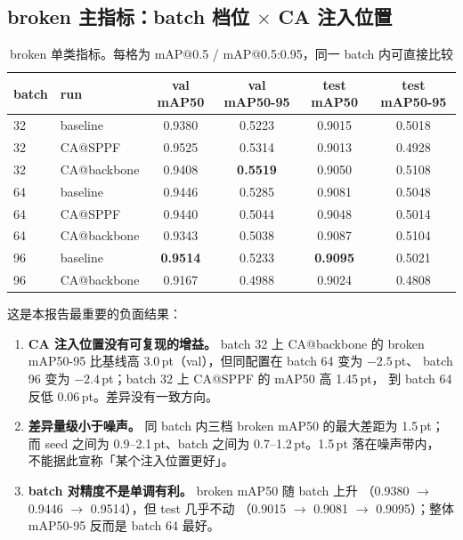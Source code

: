 \documentclass[UTF8,a4paper,11pt]{ctexart}
\begin{document}
\subsection{broken 主指标：batch 档位 $\times$ CA 注入位置}

\begin{table}[htbp]
\centering
\caption{broken 单类指标。每格为 mAP@0.5 / mAP@0.5:0.95，同一 batch 内可直接比较}
\label{tab:broken}
\begin{tabular}{llcccc}
\toprule
batch & run & val mAP50 & val mAP50-95 & test mAP50 & test mAP50-95 \\
\midrule
32 & baseline      & 0.9380 & 0.5223 & 0.9015 & 0.5018 \\
32 & CA@SPPF       & 0.9525 & 0.5314 & 0.9013 & 0.4928 \\
32 & CA@backbone   & 0.9408 & \textbf{0.5519} & 0.9050 & 0.5108 \\
\midrule
64 & baseline      & 0.9446 & 0.5285 & 0.9081 & 0.5048 \\
64 & CA@SPPF       & 0.9440 & 0.5044 & 0.9048 & 0.5014 \\
64 & CA@backbone   & 0.9343 & 0.5038 & 0.9087 & 0.5104 \\
\midrule
96 & baseline      & \textbf{0.9514} & 0.5233 & \textbf{0.9095} & 0.5021 \\
96 & CA@backbone   & 0.9167 & 0.4988 & 0.9024 & 0.4808 \\
\bottomrule
\end{tabular}
\end{table}

这是本报告最重要的负面结果：

\begin{enumerate}[label=(\arabic*)]
  \item \textbf{CA 注入位置没有可复现的增益。} batch 32 上 CA@backbone 的
        broken mAP50-95 比基线高 3.0\,pt（val），但同配置在 batch 64 变为 $-2.5$\,pt、
        batch 96 变为 $-2.4$\,pt；batch 32 上 CA@SPPF 的 mAP50 高 1.45\,pt，
        到 batch 64 反低 0.06\,pt。差异没有一致方向。
  \item \textbf{差异量级小于噪声。} 同 batch 内三档 broken mAP50 的最大差距为 1.5\,pt；
        而 seed 之间为 0.9--2.1\,pt、batch 之间为 0.7--1.2\,pt。1.5\,pt 落在噪声带内，
        不能据此宣称「某个注入位置更好」。
  \item \textbf{batch 对精度不是单调有利。} broken mAP50 随 batch 上升
        （0.9380 $\to$ 0.9446 $\to$ 0.9514），但 test 几乎不动
        （0.9015 $\to$ 0.9081 $\to$ 0.9095）；整体 mAP50-95 反而是 batch 64 最好。
\end{enumerate}
\end{document}
